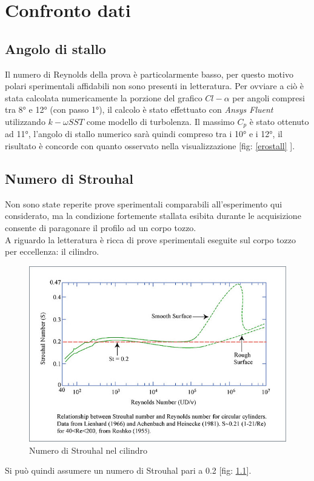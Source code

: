 \chapter{Confronto dati}
\section{Angolo di stallo}
Il numero di Reynolds della prova è particolarmente basso, per questo motivo polari sperimentali affidabili non sono presenti in letteratura. Per ovviare a ciò è stata calcolata numericamente la porzione del grafico $Cl-\alpha$ per angoli compresi tra 8° e 12° (con passo 1°), il calcolo è stato effettuato con \emph{Ansys Fluent} utilizzando $k-\omega SST$ come modello di turbolenza. Il massimo $C_p$ è stato ottenuto ad 11°, l'angolo di stallo numerico sarà quindi compreso tra i 10° e i 12°, il risultato è concorde con quanto osservato nella visualizzazione [fig: \ref{erostall} ].
\section{Numero di Strouhal}
Non sono state reperite prove sperimentali comparabili all'esperimento qui considerato, ma la condizione fortemente stallata esibita durante le acquisizione consente di paragonare il profilo ad un corpo tozzo. \\
A riguardo la letteratura è ricca di prove sperimentali eseguite sul corpo tozzo per eccellenza: il cilindro. \\

\begin{figure}[h]
\centering
\includegraphics[scale=0.35]{Figure/str.jpg}
\caption{Numero di Strouhal nel cilindro}
\label{fig: Numero di Strouhal nel cilindro}
\end{figure}
Si può quindi assumere un numero di Strouhal pari a 0.2 [fig: \ref{fig: Numero di Strouhal nel cilindro}].

